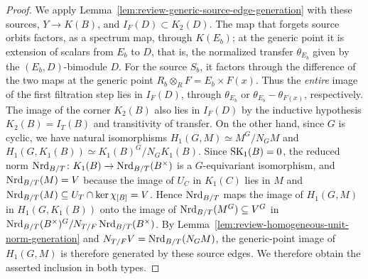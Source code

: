 \begin{proof}
We apply Lemma~\ref{lem:review-generic-source-edge-generation} with these sources, $Y\to K(B)$, and $I_F(D)\subset K_2(D)$.
The map that forgets source orbits factors, as a spectrum map, through $K(E_b)$; at the generic point it is extension of scalars from $E_b$ to $D$, that is, the normalized transfer $\theta_{E_b}$ given by the $(E_b,D)$-bimodule $D$.
For the source $S_b$, it factors through the difference of the two maps at the generic point $R_b\otimes_RF=E_b\times F(x)$.
Thus the \emph{entire} image of the first filtration step lies in $I_F(D)$, through $\theta_{E_b}$ or $\theta_{E_b}-\theta_{F(x)}$, respectively.
The image of the corner $K_2(B)$ also lies in $I_F(D)$ by the inductive hypothesis $K_2(B)=I_T(B)$ and transitivity of transfer.
On the other hand, since $G$ is cyclic, we have natural isomorphisms $H_1(G,M)\simeq M^G/N_GM$ and $H_1(G,K_1(B))\simeq K_1(B)^G/N_GK_1(B)$.
Since $\operatorname{SK}_1(B)=0$, the reduced norm $\operatorname{Nrd}_{B/T}\colon K_1(B)\to\operatorname{Nrd}_{B/T}(B^\times)$ is a $G$-equivariant isomorphism, and $\operatorname{Nrd}_{B/T}(M)=V$ because the image of $U_C$ in $K_1(C)$ lies in $M$ and $\operatorname{Nrd}_{B/T}(M)\subseteq U_T\cap\ker\chi_{[B]}=V$.
Hence $\operatorname{Nrd}_{B/T}$ maps the image of $H_1(G,M)$ in $H_1(G,K_1(B))$ onto the image of $\operatorname{Nrd}_{B/T}(M^G)\subseteq V^G$ in $\operatorname{Nrd}_{B/T}(B^\times)^G/N_{T/F}\operatorname{Nrd}_{B/T}(B^\times)$.
By Lemma~\ref{lem:review-homogeneous-unit-norm-generation} and $N_{T/F}V=\operatorname{Nrd}_{B/T}(N_GM)$, the generic-point image of $H_1(G,M)$ is therefore generated by these source edges.
We therefore obtain the asserted inclusion in both types.
\end{proof}

